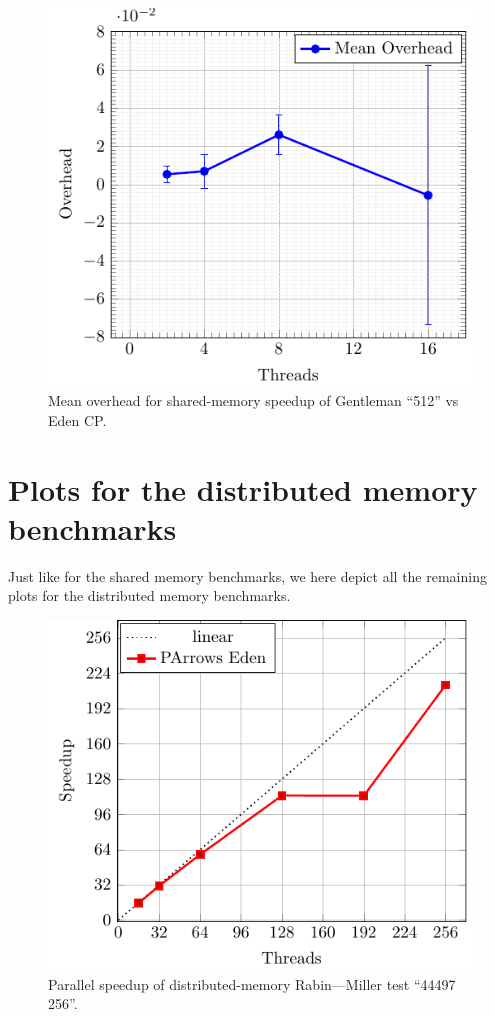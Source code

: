 \documentclass[paper=A4,twoside=true,openright,parskip=full,chapterprefix=true,headings=normal,bibliography=totoc,listof=totoc,titlepage=on,captions=tableabove,draft=false,british]{scrreprt}%
\renewcommand{\enquote}[1]{{``}#1{''}}
\begin{document}
\begin{figure}
\centering
\includegraphics{src/img/overSMTorusEden.pdf}
\caption{Mean overhead for shared-memory speedup of Gentleman
\enquote{512} vs Eden CP.\label{fig:overSMTorusEden}}
\end{figure}

\hypertarget{plots-for-the-distributed-memory-benchmarks}{%
\section{Plots for the distributed memory
benchmarks}\label{plots-for-the-distributed-memory-benchmarks}}

\label{sec:benchmarkDistPlots}

Just like for the shared memory benchmarks, we here depict all the
remaining plots for the distributed memory benchmarks.

\begin{figure}
\centering
\includegraphics{src/img/perfDistRM256.pdf}
\caption{Parallel speedup of distributed-memory Rabin---Miller test
\enquote{44497 256}.\label{fig:perfDistRM256}}
\end{figure}
\end{document}
